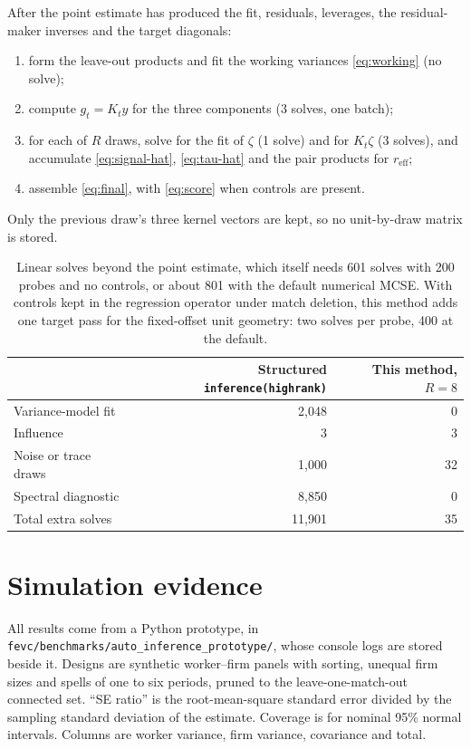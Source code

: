 \documentclass[11pt]{article}
\newcommand{\reff}{r_{\mathrm{eff}}}
\begin{document}
After the point estimate has produced the fit, residuals, leverages, the
residual-maker inverses and the target diagonals:
\begin{enumerate}
\item form the leave-out products and fit the working variances
\eqref{eq:working} (no solve);
\item compute $g_t=K_ty$ for the three components (3 solves, one batch);
\item for each of $R$ draws, solve for the fit of $\zeta$ (1 solve) and for
$K_t\zeta$ (3 solves), and accumulate \eqref{eq:signal-hat},
\eqref{eq:tau-hat} and the pair products for $\reff$;
\item assemble \eqref{eq:final}, with \eqref{eq:score} when controls are
present.
\end{enumerate}
Only the previous draw's three kernel vectors are kept, so no
unit-by-draw matrix is stored.

\begin{table}[ht]
\centering\small
\begin{tabular}{@{}lrr@{}}
\toprule
 & Structured \texttt{inference(highrank)} & This method, $R=8$ \\
\midrule
Variance-model fit & 2,048 & 0 \\
Influence & 3 & 3 \\
Noise or trace draws & 1,000 & 32 \\
Spectral diagnostic & 8,850 & 0 \\
\midrule
Total extra solves & 11,901 & 35 \\
\bottomrule
\end{tabular}
\caption{Linear solves beyond the point estimate, which itself needs 601
solves with 200 probes and no controls, or about 801 with the default
numerical MCSE. With controls kept in the regression operator under match
deletion, this method adds one target pass for the fixed-offset unit
geometry: two solves per probe, 400 at the default.}\label{tab:cost}
\end{table}

\section{Simulation evidence}\label{sec:evidence}

All results come from a Python prototype, in
\texttt{fevc/benchmarks/auto\_inference\_prototype/}, whose console logs are
stored beside it. Designs are synthetic worker--firm panels with sorting,
unequal firm sizes and spells of one to six periods, pruned to the
leave-one-match-out connected set. ``SE ratio'' is the root-mean-square
standard error divided by the sampling standard deviation of the estimate.
Coverage is for nominal 95\% normal intervals. Columns are worker variance,
firm variance, covariance and total.
\end{document}

